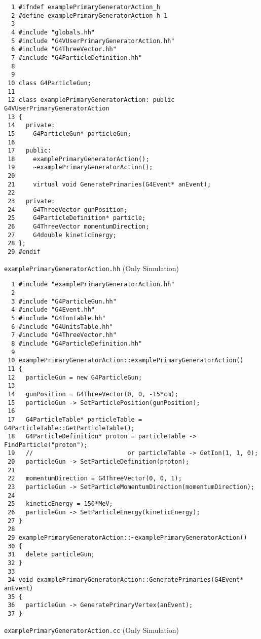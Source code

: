 \begin{code}[p]
\begin{lstlisting}
  1 #ifndef examplePrimaryGeneratorAction_h
  2 #define examplePrimaryGeneratorAction_h 1
  3 
  4 #include "globals.hh"
  5 #include "G4VUserPrimaryGeneratorAction.hh"
  6 #include "G4ThreeVector.hh"
  7 #include "G4ParticleDefinition.hh"
  8 
  9 
 10 class G4ParticleGun;
 11 
 12 class examplePrimaryGeneratorAction: public G4VUserPrimaryGeneratorAction
 13 {
 14   private:
 15     G4ParticleGun* particleGun;
 16 
 17   public:
 18     examplePrimaryGeneratorAction();
 19     ~examplePrimaryGeneratorAction();
 20 
 21     virtual void GeneratePrimaries(G4Event* anEvent);
 22 
 23   private:
 24     G4ThreeVector gunPosition;
 25     G4ParticleDefinition* particle;
 26     G4ThreeVector momentumDirection;
 27     G4double kineticEnergy;
 28 };
 29 #endif
\end{lstlisting}
\caption{\texttt{examplePrimaryGeneratorAction.hh} (Only Simulation)
\label{code-3-10}}
\end{code}

\begin{code}[p]
\begin{lstlisting}
  1 #include "examplePrimaryGeneratorAction.hh"
  2 
  3 #include "G4ParticleGun.hh"
  4 #include "G4Event.hh"
  5 #include "G4IonTable.hh"
  6 #include "G4UnitsTable.hh"
  7 #include "G4ThreeVector.hh"
  8 #include "G4ParticleDefinition.hh"
  9 
 10 examplePrimaryGeneratorAction::examplePrimaryGeneratorAction()
 11 {
 12   particleGun = new G4ParticleGun;
 13 
 14   gunPosition = G4ThreeVector(0, 0, -15*cm);
 15   particleGun -> SetParticlePosition(gunPosition);
 16 
 17   G4ParticleTable* particleTable = G4ParticleTable::GetParticleTable();
 18   G4ParticleDefinition* proton = particleTable -> FindParticle("proton");
 19   //                          or particleTable -> GetIon(1, 1, 0);
 20   particleGun -> SetParticleDefinition(proton);
 21 
 22   momentumDirection = G4ThreeVector(0, 0, 1);
 23   particleGun -> SetParticleMomentumDirection(momentumDirection);
 24 
 25   kineticEnergy = 150*MeV;
 26   particleGun -> SetParticleEnergy(kineticEnergy);
 27 }
 28 
 29 examplePrimaryGeneratorAction::~examplePrimaryGeneratorAction()
 30 {
 31   delete particleGun;
 32 }
 33 
 34 void examplePrimaryGeneratorAction::GeneratePrimaries(G4Event* anEvent)
 35 {
 36   particleGun -> GeneratePrimaryVertex(anEvent);
 37 }
\end{lstlisting}
\caption{\texttt{examplePrimaryGeneratorAction.cc} (Only Simulation)
\label{code-3-11}}
\end{code}

